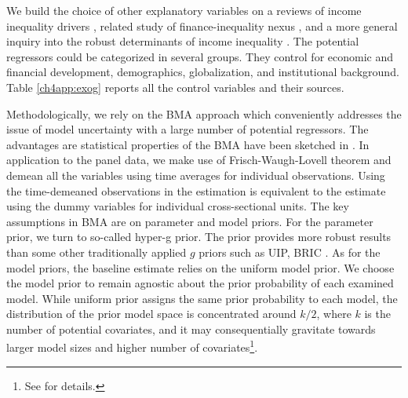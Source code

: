 \begin{refsection}
We build the choice of other explanatory variables on a reviews of income inequality drivers \parencite{roineetal2009,nolan2019drivers}, related study of finance-inequality nexus \parencite{de2017finance}, and a more general inquiry into the robust determinants of income inequality \parencite{furceri2019robust}. The potential regressors could be categorized in several groups. They control for economic and financial development, demographics, globalization, and institutional background. Table \ref{ch4app:exog} reports all the control variables and their sources. 

%
%
Methodologically, we rely on the \ac{BMA} approach which conveniently addresses the issue of model uncertainty with a large number of potential regressors. The advantages are statistical properties of the \ac{BMA} have been sketched in \textcite{Koop2003}. In application to the panel data, we make use of Frisch-Waugh-Lovell theorem and demean all the variables using time averages for individual observations. Using the time-demeaned observations in the estimation is equivalent to the estimate using the dummy variables for individual cross-sectional units. The key assumptions in \ac{BMA} are on parameter and model priors. For the parameter prior, we turn to so-called hyper-g prior. The prior provides more robust results than some other traditionally applied $g$ priors such as \ac{UIP}, \ac{BRIC} \parencite{feldkircher2012impact}. As for the model priors, the baseline estimate relies on the uniform model prior. We choose the model prior to remain agnostic about the prior probability of each examined model. While uniform prior assigns the same prior probability to each model, the distribution of the prior model space is concentrated around $k/2$, where $k$ is the number of potential covariates, and it may consequentially gravitate towards larger model sizes and higher number of covariates\footnote{See \textcite{LeySteel2009} for details.}.


\end{refsection}
